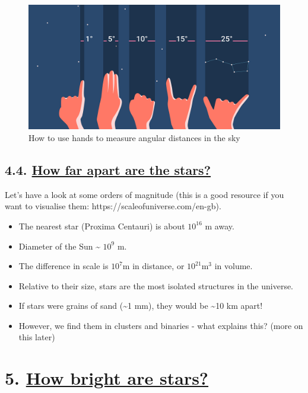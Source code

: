 \documentclass[
  letterpaper,
  DIV=11,
  numbers=noendperiod]{scrreprt}
\providecommand{\tightlist}{%
  \setlength{\itemsep}{0pt}\setlength{\parskip}{0pt}}\usepackage{longtable,booktabs,array}
\begin{document}
\begin{figure}

{\centering \includegraphics{img/measuring-sky-with-hand.png}

}

\caption{How to use hands to measure angular distances in the sky}

\end{figure}

\hypertarget{how-far-apart-are-the-stars}{%
\section{\texorpdfstring{4.4. \protect\hyperlink{toc0_}{How far apart
are the
stars?}}{4.4. How far apart are the stars?}}\label{how-far-apart-are-the-stars}}

Let's have a look at some orders of magnitude (this is a good resource
if you want to visualise them: https://scaleofuniverse.com/en-gb).

\begin{itemize}
\tightlist
\item
  The nearest star (Proxima Centauri) is about \(10^{16}\) m away.
\item
  Diameter of the Sun \textasciitilde{} \(10^{9}\) m.
\item
  The difference in scale is \(10^7\)m in distance, or
  \(10^{21}\)m\(^3\) in volume.
\item
  Relative to their size, stars are the most isolated structures in the
  universe.
\item
  If stars were grains of sand (\textasciitilde1 mm), they would be
  \textasciitilde10 km apart!
\item
  However, we find them in clusters and binaries - what explains this?
  (more on this later)
\end{itemize}

\hypertarget{how-bright-are-stars}{%
\chapter{\texorpdfstring{5. \protect\hyperlink{toc0_}{How bright are
stars?}}{5. How bright are stars?}}\label{how-bright-are-stars}}
\end{document}
